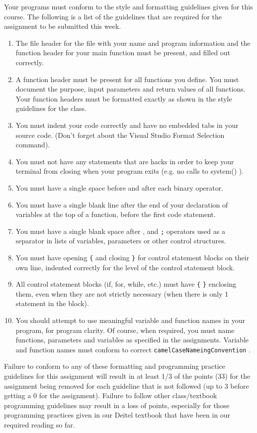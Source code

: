 \documentclass[11pt]{article}
\begin{document}
Your programs must conform to the style and formatting guidelines
given for this course.  The following is a list of the guidelines that
are required for the assignment to be submitted this week.

\begin{enumerate}
\item The file header for the file with your name and program information
  and the function header for your main function must be present, and
  filled out correctly.
\item A function header must be present for all functions you define.
   You must document the purpose, input parameters and return values
   of all functions.  Your function headers must be formatted exactly
   as shown in the style guidelines for the class.
\item You must indent your code correctly and have no embedded tabs in
  your source code. (Don't forget about the Visual Studio Format
  Selection command).
\item You must not have any statements that are hacks in order to keep
   your terminal from closing when your program exits (e.g. no calls
   to system() ).
\item You must have a single space before and after each binary operator.
\item You must have a single blank line after the end of your declaration
  of variables at the top of a function, before the first code
  statement.
\item You must have a single blank space after , and \verb~;~ operators used as a
  separator in lists of variables, parameters or other control
  structures.
\item You must have opening \verb~{~ and closing \verb~}~ for control statement blocks
  on their own line, indented correctly for the level of the control
  statement block.
\item All control statement blocks (if, for, while, etc.) must have \verb~{~
   \verb~}~ enclosing them, even when they are not strictly necessary
   (when there is only 1 statement in the block).
\item You should attempt to use meaningful variable and function names in
   your program, for program clarity.  Of course, when required, you
   must name functions, parameters and variables as specified in the
   assignments.  Variable and function names must conform to correct
   \verb~camelCaseNameingConvention~ .
\end{enumerate}

Failure to conform to any of these formatting and programming practice
guidelines for this assignment will result in at least 1/3 of the
points (33) for the assignment being removed for each guideline that
is not followed (up to 3 before getting a 0 for the
assignment). Failure to follow other class/textbook programming
guidelines may result in a loss of points, especially for those
programming practices given in our Deitel textbook that have been in
our required reading so far.
\end{document}
